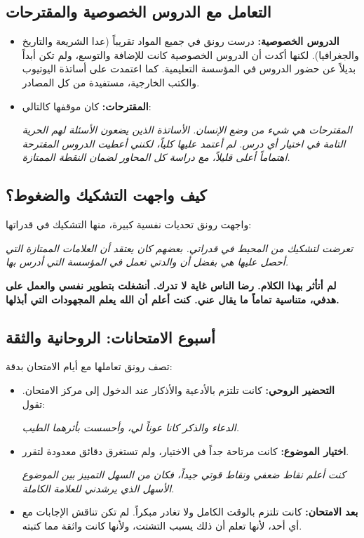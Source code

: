 \documentclass[12pt,a4paper]{book}
\newcommand{\quoteAr}[1]{%
	\begin{myquote}
		\itshape #1
	\end{myquote}
}
\newcommand{\importantAr}[1]{%
	\begin{important}
		\bfseries #1
	\end{important}
}
\begin{document}
	\subsection{التعامل مع الدروس الخصوصية والمقترحات}
			\label{sec:philo-proposals-post}
	\begin{itemize}
		\item \textbf{الدروس الخصوصية:} درست رونق في جميع المواد تقريباً (عدا الشريعة والتاريخ والجغرافيا). لكنها أكدت أن الدروس الخصوصية كانت للإضافة والتوسع، ولم تكن أبداً بديلاً عن حضور الدروس في المؤسسة التعليمية. كما اعتمدت على أساتذة اليوتيوب والكتب الخارجية، مستفيدة من كل المصادر.
		\item \textbf{المقترحات:} كان موقفها كالتالي:
		\quoteAr{المقترحات هي شيء من وضع الإنسان. الأساتذة الذين يضعون الأسئلة لهم الحرية التامة في اختيار أي درس. لم أعتمد عليها كلياً، لكنني أعطيت الدروس المقترحة اهتماماً أعلى قليلاً، مع دراسة كل المحاور لضمان النقطة الممتازة.}
	\end{itemize}
	
	\subsection{كيف واجهت التشكيك والضغوط؟}
	واجهت رونق تحديات نفسية كبيرة، منها التشكيك في قدراتها:
	\quoteAr{تعرضت لتشكيك من المحيط في قدراتي. بعضهم كان يعتقد أن العلامات الممتازة التي أحصل عليها هي بفضل أن والدتي تعمل في المؤسسة التي أدرس بها.}
	\importantAr{لم أتأثر بهذا الكلام. رضا الناس غاية لا تدرك. أنشغلت بتطوير نفسي والعمل على هدفي، متناسية تماماً ما يقال عني. كنت أعلم أن الله يعلم المجهودات التي أبذلها.}
	
	\subsection{أسبوع الامتحانات: الروحانية والثقة}
	تصف رونق تعاملها مع أيام الامتحان بدقة:
	\begin{itemize}
		\item \textbf{التحضير الروحي:} كانت تلتزم بالأدعية والأذكار عند الدخول إلى مركز الامتحان. تقول: \quoteAr{الدعاء والذكر كانا عوناً لي، وأحسست بأثرهما الطيب.}
		\item \textbf{اختيار الموضوع:} كانت مرتاحة جداً في الاختيار، ولم تستغرق دقائق معدودة لتقرر. \quoteAr{كنت أعلم نقاط ضعفي ونقاط قوتي جيداً، فكان من السهل التمييز بين الموضوع الأسهل الذي يرشدني للعلامة الكاملة.}
		\item \textbf{بعد الامتحان:} كانت تلتزم بالوقت الكامل ولا تغادر مبكراً. لم تكن تناقش الإجابات مع أي أحد، لأنها تعلم أن ذلك يسبب التشتت، ولأنها كانت واثقة مما كتبته.
	\end{itemize}
	
\end{document}

